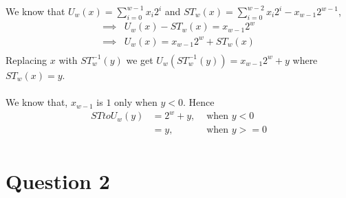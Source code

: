 \documentclass{article}
\begin{document}
We know that $U_w(x) = \sum_{i=0}^{w-1}x_i2^i$ and $ST_w(x) = \sum_{i=0}^{w-2}x_i2^i - x_{w-1}2^{w-1}$,
\begin{align*}
  \implies &U_w(x) - ST_w(x) = x_{w-1}2^w\\
  \implies &U_w(x) = x_{w-1}2^w + ST_w(x)\\
\end{align*}
Replacing $x$ with $ST_w^{-1}(y)$ we get $U_w(ST_w^{-1}(y)) = x_{w-1}2^w + y$ where $ST_w(x) = y$.\\\\
We know that, $x_{w-1}$ is $1$ only when $y < 0$. Hence
\begin{align*}
STtoU_w (y) &= 2^w + y, &\text{ when $y < 0$}\\
            &= y,        &\text{ when $y >= 0$}\\
\end{align*}

\pagebreak
\section*{Question 2}
\label{sec:question-2}
\end{document}
